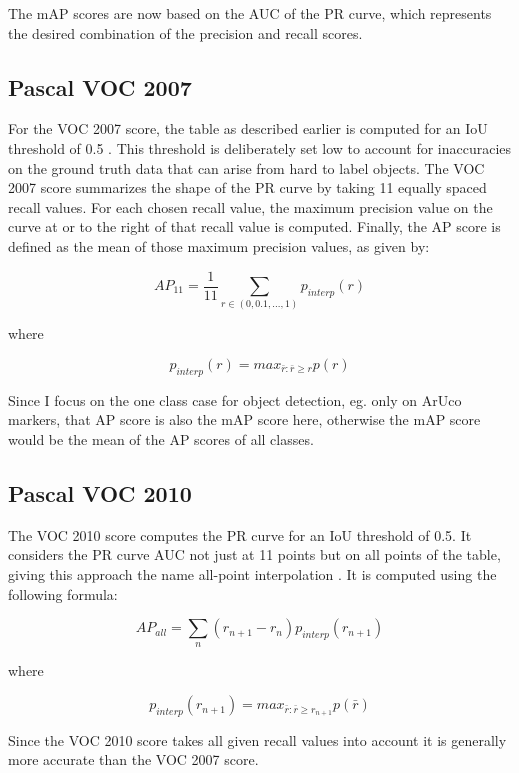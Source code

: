 \documentclass[10pt]{book}
\begin{document}
The \ac{mAP} scores are now based on the \ac{AUC} of the \ac{PR curve}, which represents the desired combination of the precision and recall scores.

\subsection{Pascal VOC 2007}

For the VOC 2007 score, the table as described earlier is computed for an \ac{IoU} threshold of 0.5 \cite{everingham2010pascal}. This threshold is deliberately set low to account for inaccuracies on the ground truth data that can arise from hard to label objects. The VOC 2007 score summarizes the shape of the \ac{PR curve} by taking 11 equally spaced recall values. For each chosen recall value, the maximum precision value on the curve at or to the right of that recall value is computed. Finally, the AP score is defined as the mean of those maximum precision values, as given by:

$$AP_{11} = \frac{1}{11} \sum_{r\in(0,0.1,...,1)}p_{interp}(r)$$

where

$$p_{interp}(r) = max_{\bar{r} : \bar{r} \geq r}p(r)$$


Since I focus on the one class case for object detection, eg. only on ArUco markers, that AP score is also the \ac{mAP} score here, otherwise the \ac{mAP} score would be the mean of the AP scores of all classes.

\subsection{Pascal VOC 2010}

The VOC 2010 score computes the \ac{PR curve} for an \ac{IoU} threshold of 0.5. It considers the \ac{PR curve} \ac{AUC} not just at 11 points but on all points of the table, giving this approach the name all-point interpolation \cite{padilla2020survey}. It is computed using the following formula:

$$AP_{all} = \sum_{n}(r_{n+1} - r_n)p_{interp}(r_{n+1})$$

where

$$p_{interp}(r_{n + 1}) = max_{\bar{r} : \bar{r} \geq r_{n+1}}p(\bar{r})$$

Since the VOC 2010 score takes all given recall values into account it is generally more accurate than the VOC 2007 score.
\end{document}
